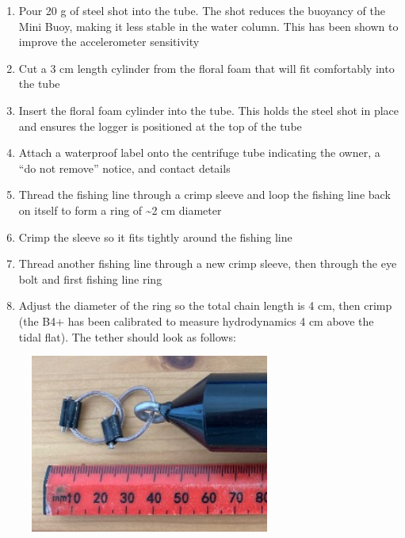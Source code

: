 \documentclass[
  letterpaper,
  DIV=11,
  numbers=noendperiod]{scrreprt}
\providecommand{\tightlist}{%
  \setlength{\itemsep}{0pt}\setlength{\parskip}{0pt}}\usepackage{longtable,booktabs,array}
\begin{document}
\begin{enumerate}
\def\labelenumi{\arabic{enumi}.}
\setcounter{enumi}{7}
\tightlist
\item
  Pour 20 g of steel shot into the tube. The shot reduces the buoyancy
  of the Mini Buoy, making it less stable in the water column. This has
  been shown to improve the accelerometer sensitivity
\item
  Cut a 3 cm length cylinder from the floral foam that will fit
  comfortably into the tube
\item
  Insert the floral foam cylinder into the tube. This holds the steel
  shot in place and ensures the logger is positioned at the top of the
  tube\\
\item
  Attach a waterproof label onto the centrifuge tube indicating the
  owner, a ``do not remove'' notice, and contact details
\item
  Thread the fishing line through a crimp sleeve and loop the fishing
  line back on itself to form a ring of \textasciitilde2 cm diameter
\item
  Crimp the sleeve so it fits tightly around the fishing line
\item
  Thread another fishing line through a new crimp sleeve, then through
  the eye bolt and first fishing line ring
\item
  Adjust the diameter of the ring so the total chain length is 4 cm,
  then crimp (the B4+ has been calibrated to measure hydrodynamics 4 cm
  above the tidal flat). The tether should look as follows:
\end{enumerate}

\begin{figure}

{\centering \includegraphics[width=0.7\textwidth,height=\textheight]{chapters/figs/B4pFishingLineChain.jpg}

}

\end{figure}
\end{document}
